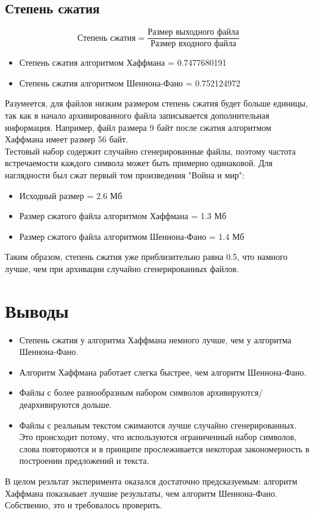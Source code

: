 \documentclass[a4paper,12pt]{article} %
\begin{document}
    \subsection{Степень сжатия}
    $$\text{Степень сжатия}=\frac{\text{Размер выходного файла}}{\text{Размер входного файла}}$$
    \begin{itemize}
        \item
        Степень сжатия алгоритмом Хаффмана = 0.7477680191
        \item
        Степень сжатия алгоритмом Шеннона-Фано = 0.752124972
    \end{itemize}
    Разумеется, для файлов низким размером степень сжатия будет больше единицы, так как
    в начало архивированного файла записывается дополнительная информация. Например, файл размера 9 байт после
    сжатия алгоритмом Хаффмана имеет размер 56 байт.\\
    Тестовый набор содержит случайно сгенерированные файлы, поэтому частота встречаемости каждого символа может
    быть примерно одинаковой. Для наглядности был сжат первый том произведения "Война и мир":
    \newpage
    \begin{itemize}
        \item
        Исходный размер = 2.6 Мб
        \item
        Размер сжатого файла алгоритмом Хаффмана = 1.3 Мб
        \item
        Размер сжатого файла алгоритмом Шеннона-Фано = 1.4 Мб
    \end{itemize}
    Таким образом, степень сжатия уже приблизительно равна 0.5, что намного лучше, чем при архивации 
    случайно сгенерированных файлов.
    \newpage
    \section{Выводы}
    \begin{itemize}
        \item
        Степень сжатия у алгоритма Хаффмана немного лучше, чем у алгоритма
        Шеннона-Фано.
        \item
        Алгоритм Хаффмана работает слегка быстрее, чем алгоритм Шеннона-Фано.
        \item
        Файлы с более разнообразным набором символов архивируются/деархивируются
        дольше.
        \item
        Файлы с реальным текстом сжимаются лучше случайно сгенерированных. Это происходит потому, что
        используются ограниченный набор символов, слова повторяются и в принципе прослеживается некоторая
        закономерность в построении предложений и текста.
    \end{itemize}
    В целом резльтат эксперимента оказался достаточно предсказуемым: алгоритм Хаффмана показывает лучшие
    результаты, чем алгоритм Шеннона-Фано. Собственно, это и требовалось проверить.
\end{document}
